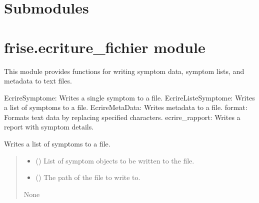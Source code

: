 \documentclass[letterpaper,10pt,english]{sphinxmanual}
\begin{document}
\section{Submodules}
\label{\detokenize{frise:submodules}}

\section{frise.ecriture\_fichier module}
\label{\detokenize{frise:module-frise.ecriture_fichier}}\label{\detokenize{frise:frise-ecriture-fichier-module}}
\sphinxAtStartPar
This module provides functions for writing symptom data, symptom lists, and metadata to text files.
\begin{description}
\sphinxAtStartPar
EcrireSymptome: Writes a single symptom to a file.
EcrireListeSymptome: Writes a list of symptoms to a file.
EcrireMetaData: Writes metadata to a file.
format: Formats text data by replacing specified characters.
ecrire\_rapport: Writes a report with symptom details.

\end{description}

\begin{fulllineitems}
\label{\detokenize{frise:frise.ecriture_fichier.EcrireListeSymptome}}
\pysigstartsignatures
{}
\pysigstopsignatures
\sphinxAtStartPar
Writes a list of symptoms to a file.
\begin{quote}\begin{description}
\begin{itemize}
\item {} 
\sphinxAtStartPar
{} () \textendash{} List of symptom objects to be written to the file.

\item {} 
\sphinxAtStartPar
{} () \textendash{} The path of the file to write to.

\end{itemize}

\sphinxAtStartPar
None

\end{description}\end{quote}

\end{fulllineitems}
\end{document}
